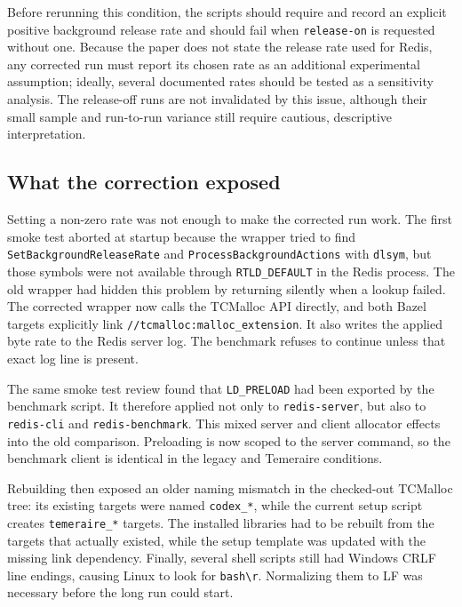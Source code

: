 \documentclass[a4paper,11pt]{article}
\begin{document}
Before rerunning this condition, the scripts should require and record an
explicit positive background release rate and should fail when
\texttt{release-on} is requested without one. Because the paper does not state
the release rate used for Redis, any corrected run must report its chosen rate
as an additional experimental assumption; ideally, several documented rates
should be tested as a sensitivity analysis. The release-off runs are not
invalidated by this issue, although their small sample and run-to-run variance
still require cautious, descriptive interpretation.

\subsection{What the correction exposed}

Setting a non-zero rate was not enough to make the corrected run work. The
first smoke test aborted at startup because the wrapper tried to find
\texttt{SetBackgroundReleaseRate} and \texttt{ProcessBackgroundActions} with
\texttt{dlsym}, but those symbols were not available through
\texttt{RTLD\_DEFAULT} in the Redis process. The old wrapper had hidden this
problem by returning silently when a lookup failed. The corrected wrapper now
calls the TCMalloc API directly, and both Bazel targets explicitly link
\texttt{//tcmalloc:malloc\_extension}. It also writes the applied byte rate to
the Redis server log. The benchmark refuses to continue unless that exact log
line is present.

The same smoke test review found that \texttt{LD\_PRELOAD} had been exported by
the benchmark script. It therefore applied not only to \texttt{redis-server},
but also to \texttt{redis-cli} and \texttt{redis-benchmark}. This mixed server
and client allocator effects into the old comparison. Preloading is now scoped
to the server command, so the benchmark client is identical in the legacy and
Temeraire conditions.

Rebuilding then exposed an older naming mismatch in the checked-out TCMalloc
tree: its existing targets were named \texttt{codex\_*}, while the current
setup script creates \texttt{temeraire\_*} targets. The installed libraries had
to be rebuilt from the targets that actually existed, while the setup template
was updated with the missing link dependency. Finally, several shell scripts
still had Windows CRLF line endings, causing Linux to look for
\texttt{bash\textbackslash r}. Normalizing them to LF was necessary before the
long run could start.
\end{document}
